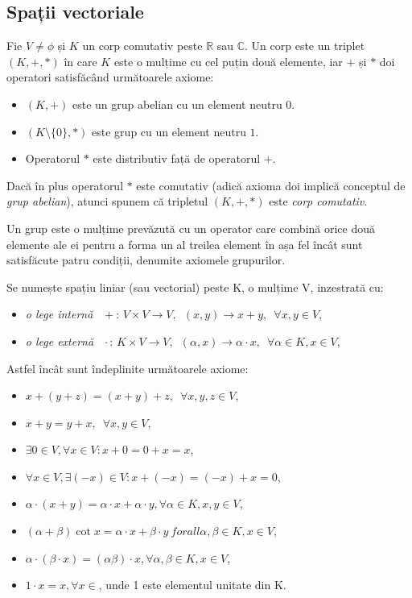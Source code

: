 \subsection{Spații vectoriale}
Fie $V \neq \phi$ și $K$ un corp comutativ peste $\mathbb{R}$ sau $\mathbb{C}$. Un corp este un triplet $(K, +, *)$ în care $K$ este o mulțime cu cel puțin două elemente, iar $+$ și $*$ doi operatori satisfăcând următoarele axiome:
\begin{itemize}
    \item $(K,+)$ este un grup abelian cu un element neutru $0$.
    \item $(K \setminus \{0\}, *)$ este grup cu un element neutru $1$.
    \item Operatorul $*$ este distributiv față de operatorul $+$.
\end{itemize}

Dacă în plus operatorul $*$ este comutativ (adică axioma doi implică conceptul de \textit{grup abelian}), atunci spunem că tripletul $(K, +, *)$ este \textit{corp comutativ}.

Un grup este o mulțime prevăzută cu un operator care combină orice două elemente ale ei pentru a forma un al treilea element în așa fel încât sunt satisfăcute patru condiții, denumite axiomele grupurilor.

Se numește spațiu liniar (sau vectorial) peste K, o mulțime V, inzestrată cu:
\begin{itemize}
    \item \textit{o lege internă} $\enspace+$: \enspace$V \times V \rightarrow V,\enspace (x, y) \rightarrow x + y,\enspace \forall x,y \in V$,
    \item \textit{o lege externă} $\enspace\cdot$: $K \times V \rightarrow V, \enspace (\alpha, x) \rightarrow \alpha \cdot x, \enspace \forall \alpha \in K, x \in V$, 
\end{itemize}

Astfel încât sunt îndeplinite următoarele axiome:

\begin{itemize}
    \item $x + (y + z) = (x + y) + z,  \enspace \forall x,y,z \in V$,
    \item $x + y = y + x, \enspace \forall x, y \in V$,
    \item $\exists0 \in V, \forall x \in V: x + 0 = 0 + x = x$,
    \item $\forall x \in V, \exists (-x) \in V: x + (-x) = (-x) + x = 0$,
    \item $\alpha \cdot (x+y) = \alpha \cdot x + \alpha \cdot y, \forall \alpha \in K, x,y \in V$,
    \item $(\alpha + \beta)\cot x = \alpha \cdot x + \beta \cdot y\ forall \alpha, \beta \in K, x \in V$,
    \item $\alpha \cdot (\beta \cdot x) = (\alpha \beta ) \cdot x, \forall \alpha, \beta \in K, x \in V$,
    \item $1 \cdot x = x, \forall x \in $, unde 1 este elementul unitate din K.
\end{itemize}

